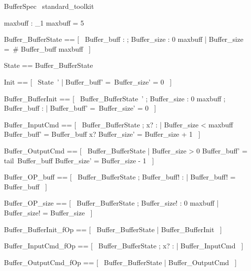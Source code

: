\documentclass{article}
\begin{document}
\begin{zsection} \SECTION BufferSpec \parents~standard\_toolkit
\end{zsection}

\begin{axdef}
	maxbuff : \nat_1 
\where
 maxbuff = 5
\end{axdef}

\begin{zed}
	Buffer\_BufferState == [~  Buffer\_buff : \seq \nat ; Buffer\_size : 0 \upto maxbuff | Buffer\_size =~\# Buffer\_buff \leq maxbuff  ~]
\end{zed}

\begin{zed}
	State == Buffer\_BufferState
\end{zed}

\begin{zed}
	Init == [~  State~' | Buffer\_buff' =~\langle \rangle \land Buffer\_size' = 0  ~]
\end{zed}

\begin{zed}
	Buffer\_BufferInit == [~  Buffer\_BufferState~' ; Buffer\_size : 0 \upto maxbuff ; Buffer\_buff : \seq \nat | Buffer\_buff' =~\langle \rangle \land Buffer\_size' = 0  ~]
\end{zed}

\begin{zed}
	Buffer\_InputCmd == [~  \Delta Buffer\_BufferState ; x? : \nat | Buffer\_size < maxbuff \land Buffer\_buff' = Buffer\_buff \cat \langle x? \rangle \land Buffer\_size' = Buffer\_size + 1  ~]
\end{zed}

\begin{zed}
	Buffer\_OutputCmd == [~  \Delta Buffer\_BufferState | Buffer\_size > 0 \land Buffer\_buff' = tail~Buffer\_buff \land Buffer\_size' = Buffer\_size - 1  ~]
\end{zed}

\begin{zed}
	Buffer\_OP\_buff == [~  \Xi Buffer\_BufferState ; Buffer\_buff! : \seq \nat | Buffer\_buff! = Buffer\_buff  ~]
\end{zed}

\begin{zed}
	Buffer\_OP\_size == [~  \Xi Buffer\_BufferState ; Buffer\_size! : 0 \upto maxbuff | Buffer\_size! = Buffer\_size  ~]
\end{zed}

\begin{zed}
	Buffer\_BufferInit\_fOp == [~  \Xi Buffer\_BufferState | \lnot \pre Buffer\_BufferInit  ~]
\end{zed}

\begin{zed}
	Buffer\_InputCmd\_fOp == [~  \Xi Buffer\_BufferState ; x? : \nat | \lnot \pre Buffer\_InputCmd  ~]
\end{zed}

\begin{zed}
	Buffer\_OutputCmd\_fOp == [~  \Xi Buffer\_BufferState | \lnot \pre Buffer\_OutputCmd  ~]
\end{zed}
\end{document}
